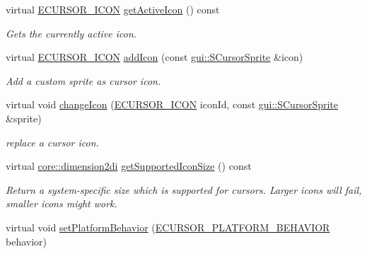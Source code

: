 \begin{DoxyCompactItemize}
virtual \hyperlink{namespaceirr_1_1gui_aefee802dd632c5735703e40ef40f879b}{E\+C\+U\+R\+S\+O\+R\+\_\+\+I\+C\+ON} \hyperlink{classirr_1_1gui_1_1ICursorControl_aeffb0659049614ced7a56b607177c3bb}{get\+Active\+Icon} () const
\begin{DoxyCompactList}\small\item\em Gets the currently active icon. \end{DoxyCompactList}\item 
virtual \hyperlink{namespaceirr_1_1gui_aefee802dd632c5735703e40ef40f879b}{E\+C\+U\+R\+S\+O\+R\+\_\+\+I\+C\+ON} \hyperlink{classirr_1_1gui_1_1ICursorControl_a102ff455c70595886281e636ef063d3b}{add\+Icon} (const \hyperlink{structirr_1_1gui_1_1SCursorSprite}{gui\+::\+S\+Cursor\+Sprite} \&icon)
\begin{DoxyCompactList}\small\item\em Add a custom sprite as cursor icon. \end{DoxyCompactList}\item 
virtual void \hyperlink{classirr_1_1gui_1_1ICursorControl_a3e7c8cb1f03e1ccc31fcc3c30f717762}{change\+Icon} (\hyperlink{namespaceirr_1_1gui_aefee802dd632c5735703e40ef40f879b}{E\+C\+U\+R\+S\+O\+R\+\_\+\+I\+C\+ON} icon\+Id, const \hyperlink{structirr_1_1gui_1_1SCursorSprite}{gui\+::\+S\+Cursor\+Sprite} \&sprite)
\begin{DoxyCompactList}\small\item\em replace a cursor icon. \end{DoxyCompactList}\item 
\mbox{\label{classirr_1_1gui_1_1ICursorControl_a0710b659cbab1474e3486f7dd0e8c35e}} 
virtual \hyperlink{namespaceirr_1_1core_aacaa9f583051276807125e964db2f073}{core\+::dimension2di} \hyperlink{classirr_1_1gui_1_1ICursorControl_a0710b659cbab1474e3486f7dd0e8c35e}{get\+Supported\+Icon\+Size} () const
\begin{DoxyCompactList}\small\item\em Return a system-\/specific size which is supported for cursors. Larger icons will fail, smaller icons might work. \end{DoxyCompactList}\item 
\mbox{\label{classirr_1_1gui_1_1ICursorControl_ad7688bb200945f15877a598e8be53878}} 
virtual void \hyperlink{classirr_1_1gui_1_1ICursorControl_ad7688bb200945f15877a598e8be53878}{set\+Platform\+Behavior} (\hyperlink{namespaceirr_1_1gui_abbd186f9cfba2f805d98248df226acef}{E\+C\+U\+R\+S\+O\+R\+\_\+\+P\+L\+A\+T\+F\+O\+R\+M\+\_\+\+B\+E\+H\+A\+V\+I\+OR} behavior)

\end{DoxyCompactItemize}
